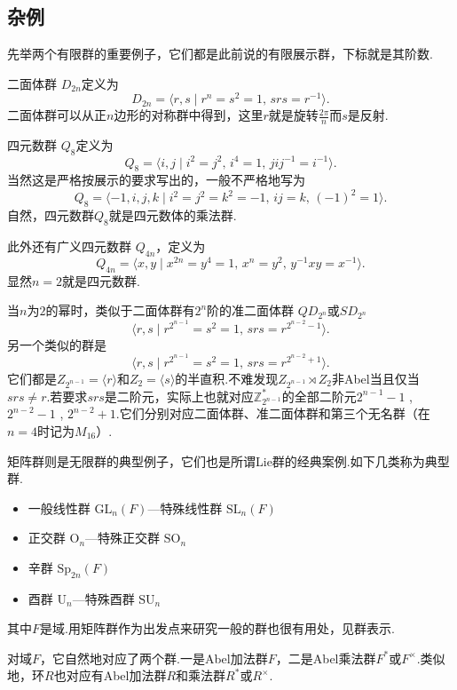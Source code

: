 \subsection{杂例}
先举两个有限群的重要例子，它们都是此前说的有限展示群，下标就是其阶数.

{\heiti 二面体群} $D_{2n}$定义为
\[
	D_{2n}=\langle r,s\mid r^n=s^2=1,\,srs=r^{-1}\rangle .
\]
二面体群可以从正$n$边形的对称群中得到，这里$r$就是旋转$\frac{2\pi}{n}$而$s$是反射.

{\heiti 四元数群} $Q_8$定义为
\[
	Q_8=\langle i,j\mid i^2=j^2,\,i^4=1,\,jij^{-1}=i^{-1}\rangle .
\]
当然这是严格按展示的要求写出的，一般不严格地写为
\[
	Q_8=\langle -1,i,j,k\mid i^2=j^2=k^2=-1,\,ij=k,\,(-1)^2=1\rangle .
\]
自然，四元数群$Q_8$就是四元数体的乘法群.
\begin{remark}
	此外还有{\heiti 广义四元数群} $Q_{4n}$，定义为
	\[
		Q_{4n}=\langle x,y\mid x^{2n}=y^4=1,\,x^n=y^2,\,y^{-1}xy=x^{-1}\rangle .
	\]
	显然$n=2$就是四元数群.

	当$n$为$2$的幂时，类似于二面体群有$2^n$阶的{\heiti 准二面体群} $QD_{2^n}$或$SD_{2^n}$\footnotemark
	\[
		\langle r,s\mid r^{2^{n-1}}=s^2=1,\,srs=r^{2^{n-2}-1}\rangle .
	\]
	另一个类似的群是
	\[
		\langle r,s\mid r^{2^{n-1}}=s^2=1,\,srs=r^{2^{n-2}+1}\rangle .
	\]
	它们都是$Z_{2^{n-1}}=\langle r\rangle $和$Z_2=\langle s\rangle $的半直积.不难发现$Z_{2^{n-1}}\rtimes Z_2$非Abel当且仅当$srs\ne r$.若要求$srs$是二阶元，实际上也就对应$\mathbb{Z}_{2^{n-1}}^*$的全部二阶元\footnotemark$2^{n-1}-1$ , $2^{n-2}-1$ , $2^{n-2}+1$.它们分别对应二面体群、准二面体群和第三个无名群（在$n=4$时记为$M_{16}$）.
\end{remark}

{\heiti 矩阵群}则是无限群的典型例子，它们也是所谓Lie群的经典案例.如下几类称为{\heiti 典型群}.
\begin{itemize}
	\item {\heiti 一般线性群} $\mathrm{GL}_n(F)$\quad ---{\heiti 特殊线性群} $\mathrm{SL}_n(F)$
	\item {\heiti 正交群} $\mathrm{O}_n$\quad ---{\heiti 特殊正交群} $\mathrm{SO}_n$
	\item {\heiti 辛群} $\mathrm{Sp}_{2n}(F)$
	\item {\heiti 酉群} $\mathrm{U}_n$\quad ---{\heiti 特殊酉群} $\mathrm{SU}_n$
\end{itemize}
其中$F$是域.用矩阵群作为出发点来研究一般的群也很有用处，见群表示.%

对域$F$，它自然地对应了两个群.一是Abel加法群$F$，二是Abel乘法群$F^*$或$F^\times$.类似地，环$R$也对应有Abel加法群$R$和乘法群$R^*$或$R^\times$.
